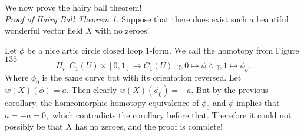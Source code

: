 \documentclass[letter]{article}
\newenvironment{menumerate}{%
  \edef\backupindent{\the\parindent}%
  \enumerate%
  \setlength{\parindent}{\backupindent}%
}{\endenumerate}
\begin{document}
\begin{menumerate}
\begin{menumerate}
 		We now prove the hairy ball theorem!\\
 		\noindent
 		\emph{Proof of Hairy Ball Theorem 1.} Suppose that there does exist such a beautiful wonderful vector field $X$
 		with no zeroes!

 		Let $\phi$ be a nice artic circle closed loop $1$-form. We call the homotopy from Figure $135$
 		\begin{equation}
 			H_r: C_1(U) \times [0,1] \to C_1(U), \gamma, 0 \mapsto \phi \wedge \gamma, 1 \mapsto \phi_o. 
 		\end{equation}
 		Where $\phi_0$ is the same curve but with its orientation reversed. Let $w(X)(\phi) = a.$
 		Then clearly $w(X)(\phi_0) = -a.$ But by the previous corollary, the homeomorphic homotopy equivalence of
 		$\phi_0$ and $\phi$ implies that $a = -a = 0,$ which contradicts the corollary before that.
 		Therefore it could not possibly be that $X$ has no zeroes, and the proof is complete!
	\end{menumerate}
\end{menumerate}
\end{document}
